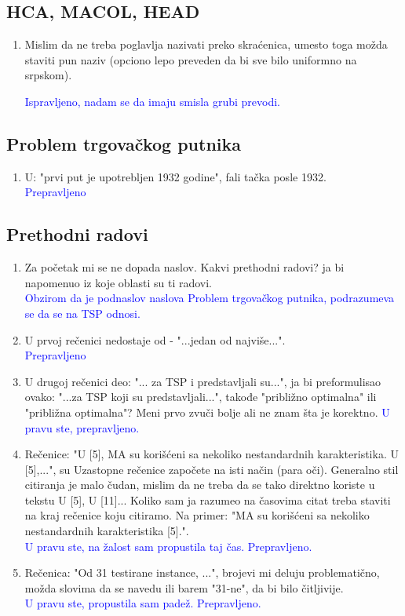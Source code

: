 \documentclass[a4paper]{report}
\newcommand{\odgovor}[1]{\textcolor{blue}{#1}}
\begin{document}
\subsection{HCA, MACOL, HEAD}
\begin{enumerate}
  \item Mislim da ne treba poglavlja nazivati preko skraćenica, umesto toga možda staviti pun naziv (opciono lepo preveden da bi sve bilo uniformno na srpskom).
  
  \odgovor{Ispravljeno, nadam se da imaju smisla grubi prevodi.}
\end{enumerate}

\subsection{Problem trgovačkog putnika}
\begin{enumerate}
  \item U: "prvi put je upotrebljen 1932 godine", fali tačka posle 1932.\\
\odgovor{Prepravljeno \\}
\end{enumerate}


\subsection{Prethodni radovi}
\begin{enumerate}
  \item Za početak mi se ne dopada naslov. Kakvi prethodni radovi? ja bi napomenuo iz koje oblasti su ti radovi. \\
  \odgovor{ Obzirom da je podnaslov naslova Problem trgovačkog putnika, podrazumeva se da se na TSP odnosi.} 
  
  \item U prvoj rečenici nedostaje od -  "...jedan od najviše...".\\
  \odgovor{ Prepravljeno }
  \item U drugoj rečenici deo: "... za TSP i predstavljali su...", ja bi preformulisao ovako:  "...za TSP koji su predstavljali...", takođe "približno optimalna" ili "približna optimalna"? Meni prvo zvuči bolje ali ne znam šta je korektno.
  \odgovor {U pravu ste, prepravljeno. }
  
  \item Rečenice: "U [5], MA su korišćeni sa nekoliko nestandardnih karakteristika. U
[5],...", su Uzastopne rečenice započete na isti način (para oči). Generalno stil citiranja je malo čudan, mislim da ne treba da se tako direktno koriste u tekstu 
U [5], U [11]... Koliko sam ja razumeo na časovima citat treba staviti na kraj rečenice koju citiramo. Na primer: "MA su korišćeni sa nekoliko nestandardnih karakteristika [5].". \\
 \odgovor{ U pravu ste, na žalost sam propustila taj čas. Prepravljeno.}

  \item Rečenica: "Od 31 testirane instance, ...", brojevi mi deluju problematično, možda slovima da se navedu ili barem "31-ne", da bi bilo čitljivije.\\
  \odgovor{U pravu ste, propustila sam padež. Prepravljeno.}
\end{enumerate}
\end{document}
